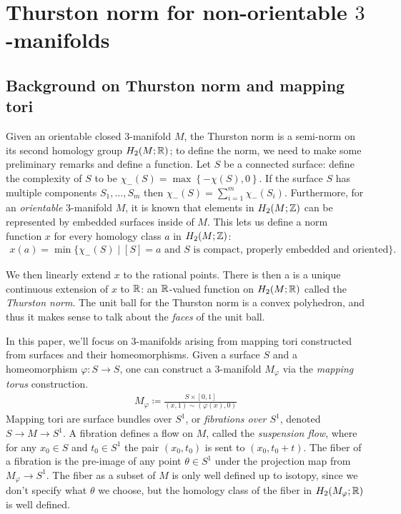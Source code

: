 \section{Thurston norm for non-orientable $3$-manifolds}
\label{sec:thur-norm-non-orientable}

\subsection{Background on Thurston norm and mapping tori}
\label{sec:backgr-thurst-norm}

Given an orientable closed $3$-manifold $M$, the Thurston norm is a semi-norm on its second homology group $H_2(M; \mathbb{R})$; to define the norm, we need to make some preliminary remarks and define a function.
Let $S$ be a connected surface: define the complexity of $S$ to be $\chi_-(S) = \max\left\{-\chi(S),0\right\}$.
If the surface $S$ has multiple components $S_1, \ldots, S_m$ then $\chi_-(S) = \displaystyle\sum_{i=1}^m\chi_-(S_i)$.
Furthermore, for an \emph{orientable} 3-manifold $M$, it is known that elements in $H_2(M ; \mathbb{Z})$ can be represented by embedded surfaces inside of $M$.
This lets us define a norm function $x$ for every homology class $a$ in $H_2(M; \mathbb{Z})$:
\begin{align*}
  x(a) = \min\{\chi_-(S) \mid [S] = a \text{ and $S$ is compact, properly embedded and oriented}\}.
\end{align*}

We then linearly extend $x$ to the rational points.
There is then a is a unique continuous extension of $x$ to $\mathbb{R}$: an $\mathbb{R}$-valued function on $H_2(M; \mathbb{R})$ called the \emph{Thurston norm}.
The unit ball for the Thurston norm is a convex polyhedron, and thus it makes
sense to talk about the \emph{faces} of the unit ball.

In this paper, we'll focus on $3$-manifolds arising from mapping tori constructed from surfaces and their homeomorphisms.
Given a surface $S$ and a homeomorphism $\varphi: S \to S$, one can construct a $3$-manifold $M_\varphi$ via the \emph{mapping torus} construction.
\begin{align*}
  M_\varphi \coloneqq \frac{S \times [0,1]}{(x,1) \sim (\varphi(x), 0)}
\end{align*}
Mapping tori are surface bundles over $S^1$, or \emph{fibrations over $S^1$}, denoted $S\rightarrow M\rightarrow S^1$.
A fibration defines a flow on $M$, called the \emph{suspension flow}, where for any $x_0\in S$ and $t_0\in S^1$ the pair $(x_0,t_0)$ is sent to $(x_0,t_0+t)$.
The fiber of a fibration is the pre-image of any point $\theta \in S^1$ under the projection map from $M_{\varphi} \to S^1$.
The fiber as a subset of $M$ is only well defined up to isotopy, since we don't specify what $\theta$ we choose, but the homology class of the fiber in $H_2(M_{\varphi}; \mathbb{R})$ is well defined.

